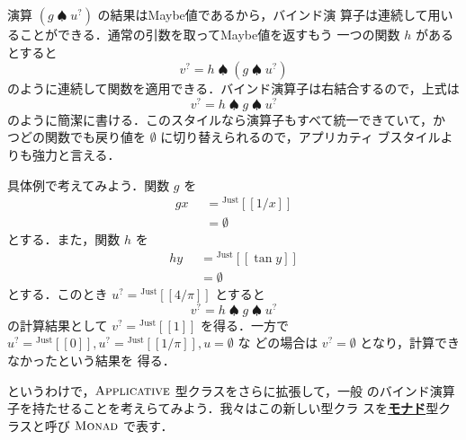 \documentclass[a5paper,twoside,fleqn,draft]{jsbook}
\def\[{[\![}
\def\]{]\!]}
\newcommand{\keyword}[1]{{\underline{\textbf{#1}}}}
\newcommand{\mKeyword}[1]{\mathsf{#1}}
\newcommand{\mOtherwiseKeyword}{\mKeyword{otherwise}}
\DeclareMathOperator{\mOtherwise}{\mOtherwiseKeyword}
\newcommand{\mNothing}{\emptyset}
\DeclareMathOperator{\mBindMaybe}{\spadesuit}
\newcommand{\mValueConstructor}[1]{\mathrm{#1}}
\newcommand{\mValueWith}[2]{{}^\mValueConstructor{#1}\[#2\]}
\newcommand{\mJustWith}[1]{\mValueWith{Just}{#1}}
\newcommand{\mTypeClass}[1]{\textsc{#1}} %
\newcommand{\mApplicativeTypeClass}{\mTypeClass{Applicative}}
\newcommand{\mMonadTypeClass}{\mTypeClass{Monad}}
\newcommand{\mMaybe}[1]{{#1}^?}
\newcommand{\mGuard}[1]{\mathop{\mid_{#1}}}
\begin{document}
演算 $(g\mBindMaybe\mMaybe{u})$ の結果はMaybe値であるから，バインド演
算子は連続して用いることができる．通常の引数を取ってMaybe値を返すもう
一つの関数 $h$ があるとすると
\begin{equation}
  \mMaybe{v}=h\mBindMaybe{}(g\mBindMaybe\mMaybe{u})
\end{equation}
のように連続して関数を適用できる．バインド演算子は右結合するので，上式は
\begin{equation}
  \label{eq:maybe-z-bind-style}
  \mMaybe{v}=h\mBindMaybe g\mBindMaybe\mMaybe{u}
\end{equation}
のように簡潔に書ける．このスタイルなら演算子もすべて統一できていて，か
つどの関数でも戻り値を $\mNothing$ に切り替えられるので，アプリカティ
ブスタイルよりも強力と言える．

具体例で考えてみよう．関数 $g$ を
\begin{equation}
  \begin{aligned}
    gx&\mGuard{x\neq0}=\mJustWith{1/x}\\
    &\mGuard{\mOtherwise}=\mNothing
  \end{aligned}
\end{equation}
とする．また，関数 $h$ を
\begin{equation}
  \begin{aligned}
    hy&\mGuard{-\frac{\pi}{2}<y<\frac{\pi}{2}}=\mJustWith{\tan y}\\
    &\mGuard{\mOtherwise}=\mNothing
  \end{aligned}
\end{equation}
とする．このとき $\mMaybe{u}=\mJustWith{4/\pi}$ とすると
\begin{equation}
\mMaybe{v}=h\mBindMaybe g\mBindMaybe\mMaybe{u}
\end{equation}
の計算結果として $\mMaybe{v}=\mJustWith{1}$ を得る．一方で
$\mMaybe{u}=\mJustWith{0},\mMaybe{u}=\mJustWith{1/\pi},u=\mNothing$ な
どの場合は $\mMaybe{v}=\mNothing$ となり，計算できなかったという結果を
得る．


というわけで，$\mApplicativeTypeClass$ 型クラスをさらに拡張して，一般
のバインド演算子を持たせることを考えらてみよう．我々はこの新しい型クラ
スを\keyword{モナド}型クラスと呼び $\mMonadTypeClass$ で表す．
\end{document}
